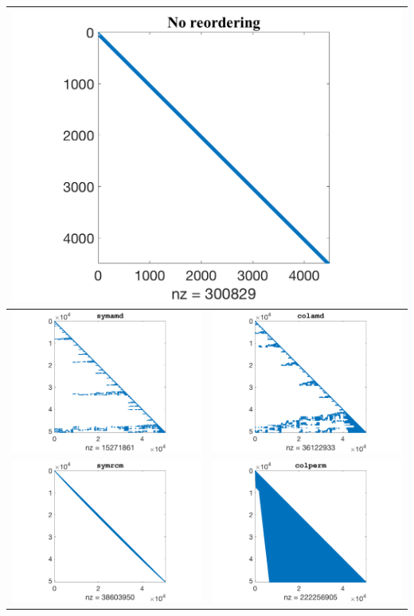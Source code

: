 \documentclass[11pt]{article}
\theoremstyle{definition}
\theoremstyle{remark}
\theoremstyle{plain}
\begin{document}
\begin{tabular}{|c|c|}
  \hline
  \multicolumn{2}{|c|}{\includegraphics[width=0.45\linewidth]{../Figures/default.png}}\\\hline
  \includegraphics[width=0.45\linewidth]{../Figures/symamdb.png}&\includegraphics[width=0.45\linewidth]{../Figures/colamdb.png}\\\hline
  \includegraphics[width=0.45\linewidth]{../Figures/symrcmb.png}&\includegraphics[width=0.45\linewidth]{../Figures/colpermb.png}\\\hline
\end{tabular}
\end{document}
